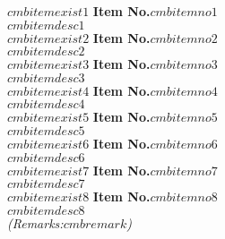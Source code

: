 
$cmbitemexist1$
\noindent\textbf{Item No.$cmbitemno1$}\\
\noindent $cmbitemdesc1$\\
\fi
$cmbitemexist2$
\noindent\textbf{Item No.$cmbitemno2$}\\
\noindent $cmbitemdesc2$\\
\fi
$cmbitemexist3$
\noindent\textbf{Item No.$cmbitemno3$}\\
\noindent $cmbitemdesc3$\\
\fi
$cmbitemexist4$
\noindent\textbf{Item No.$cmbitemno4$}\\
\noindent $cmbitemdesc4$\\
\fi
$cmbitemexist5$
\noindent\textbf{Item No.$cmbitemno5$}\\
\noindent $cmbitemdesc5$\\
\fi
$cmbitemexist6$
\noindent\textbf{Item No.$cmbitemno6$}\\
\noindent $cmbitemdesc6$\\
\fi
$cmbitemexist7$
\noindent\textbf{Item No.$cmbitemno7$}\\
\noindent $cmbitemdesc7$\\
\fi
$cmbitemexist8$
\noindent\textbf{Item No.$cmbitemno8$}\\
\noindent $cmbitemdesc8$\\
\fi
\noindent\emph{(Remarks:$cmbremark$)}\\
\vspace*{-\baselineskip}
